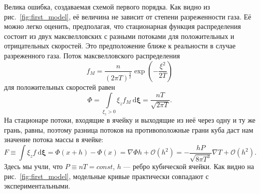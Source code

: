 \documentclass[a4paper,10pt]{article}
\newcommand{\dd}{\:\mathrm{d}}
\begin{document}
Велика ошибка, создаваемая схемой первого порядка.
Как видно из рис.~\ref{fig:first_model}, её величина не зависит от степени разреженности газа.
Её можно легко оценить, предполагая, что стационарная функция распределения состоит из двух максвелловских
с разными потоками для положительных и отрицательных скоростей.
Это предположение ближе к реальности в случае разреженного газа.
Поток максвелловского распределения
\[ f_M = \frac{n}{(2\pi T)^\frac3{2}}\exp\left(-\frac{\xi^2}{2T}\right) \]
для положительных скоростей равен
\[ \Phi = \int\limits_{\xi_z > 0}{\xi_z f_M \dd\boldsymbol\xi} = \frac{nT}{\sqrt{2\pi T}}. \]
На стационаре потоки, входящие в ячейку и выходящие из неё через одну и ту же грань, равны,
поэтому разница потоков на противоположные грани куба даст нам значение потока массы в ячейке:
\[ F \equiv \int{\xi_z f \dd\boldsymbol\xi} = \Phi(x+h)-\Phi(x) = \nabla\Phi h+\mathcal{O}(h^2)
	= -\frac{hP}{\sqrt{8\pi T^3}}\nabla T+\mathcal{O}(h^2). \]
Здесь мы учли, что \(P\equiv nT=const\), \(h\) --- ребро кубической ячейки.
Как видно на рис.~\ref{fig:first_model}, модельные кривые практически совпадают с экспериментальными.



\end{document}
